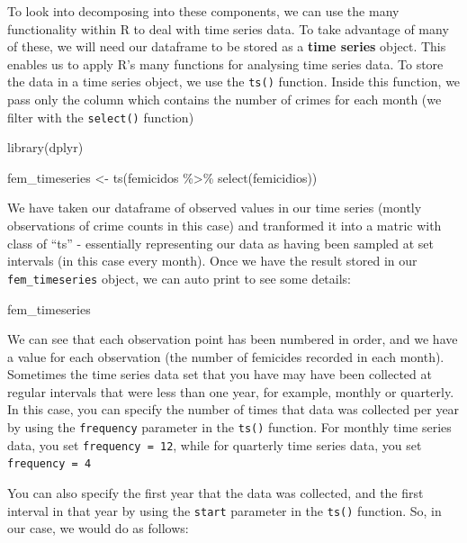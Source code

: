 \documentclass[
]{book}
\newenvironment{Shaded}{\begin{snugshade}}{\end{snugshade}}
\newcommand{\FunctionTok}[1]{\textcolor[rgb]{0.00,0.00,0.00}{#1}}
\newcommand{\NormalTok}[1]{#1}
\newcommand{\OtherTok}[1]{\textcolor[rgb]{0.56,0.35,0.01}{#1}}
\newcommand{\SpecialCharTok}[1]{\textcolor[rgb]{0.00,0.00,0.00}{#1}}
\begin{document}
To look into decomposing into these components, we can use the many functionality within R to deal with time series data. To take advantage of many of these, we will need our dataframe to be stored as a \textbf{time series} object. This enables us to apply R's many functions for analysing time series data. To store the data in a time series object, we use the \texttt{ts()} function. Inside this function, we pass only the column which contains the number of crimes for each month (we filter with the \texttt{select()} function)

\begin{Shaded}
\begin{Highlighting}[]
\FunctionTok{library}\NormalTok{(dplyr)}
 
\NormalTok{fem\_timeseries }\OtherTok{\textless{}{-}} \FunctionTok{ts}\NormalTok{(femicidos }\SpecialCharTok{\%\textgreater{}\%} 
                       \FunctionTok{select}\NormalTok{(femicidios))}
\end{Highlighting}
\end{Shaded}

We have taken our dataframe of observed values in our time series (montly observations of crime counts in this case) and tranformed it into a matric with class of ``ts'' - essentially representing our data as having been sampled at set intervals (in this case every month). Once we have the result stored in our \texttt{fem\_timeseries} object, we can auto print to see some details:

\begin{Shaded}
\begin{Highlighting}[]
\NormalTok{fem\_timeseries}
\end{Highlighting}
\end{Shaded}

We can see that each observation point has been numbered in order, and we have a value for each observation (the number of femicides recorded in each month). Sometimes the time series data set that you have may have been collected at regular intervals that were less than one year, for example, monthly or quarterly. In this case, you can specify the number of times that data was collected per year by using the \texttt{frequency} parameter in the \texttt{ts()} function. For monthly time series data, you set \texttt{frequency\ =\ 12}, while for quarterly time series data, you set \texttt{frequency\ =\ 4}

You can also specify the first year that the data was collected, and the first interval in that year by using the \texttt{start} parameter in the \texttt{ts()} function. So, in our case, we would do as follows:
\end{document}
